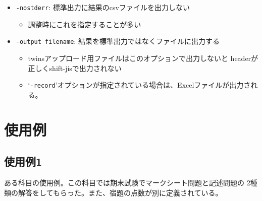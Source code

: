 \begin{itemize}
\item \texttt{-nostderr}: 標準出力に結果のcsvファイルを出力しない

\begin{itemize}
\item 調整時にこれを指定することが多い

\end{itemize}

\item \texttt{-output filename}: 結果を標準出力ではなくファイルに出力する

\begin{itemize}
\item twinsアップロード用ファイルはこのオプションで出力しないと
headerが正しくshift-jisで出力されない

\item `\texttt{-record}'オプションが指定されている場合は、Excelファイルが出力される。

\end{itemize}

\end{itemize}

\section{使用例}
\label{使用例}

\subsection{使用例1}
\label{使用例1}

ある科目の使用例。この科目では期末試験でマークシート問題と記述問題の
2種類の解答をしてもらった。また、宿題の点数が別に定義されている。

